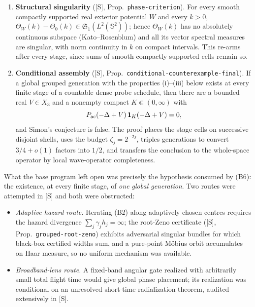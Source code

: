 \documentclass[11pt]{article}
\theoremstyle{remark}
\theoremstyle{definition}
\newcommand{\T}{\mathbb T}
\newcommand{\Sone}{\mathfrak S_1}
\newcommand{\ac}{{\rm ac}}
\begin{document}
\begin{enumerate}[label=\textup{(B\arabic*)},leftmargin=*]
       each targeted integral with its $\T^M$ mean \emph{and} locking of
       every listed protected quantity on all of $K$.
 \item \textbf{Structural singularity} ([S], Prop.\
       \texttt{phase-criterion}).  For every smooth compactly supported real
       exterior potential $W$ and every $k>0$,
       $\Theta_W(k)-\Theta_0(k)\in\Sone(L^2(\mathbb S^2))$; hence
       $\Theta_W(k)$ has no absolutely continuous subspace (Kato--Rosenblum)
       and all its vector spectral measures are singular, with norm
       continuity in $k$ on compact intervals.  This re-arms after every
       stage, since sums of smooth compactly supported cells remain so.
 \item \textbf{Conditional assembly} ([S], Prop.\
       \texttt{conditional-counterexample-final}).  If a global grouped
       generation with the properties (i)--(iii) below exists at every finite
       stage of a countable dense probe schedule, then there are a bounded
       real $V\in X_3$ and a nonempty compact $K\Subset(0,\infty)$ with
       \begin{equation}
        P_{\ac}(-\Delta+V)\,\mathbf 1_K(-\Delta+V)=0 ,
        \label{eq:final-counterexample}
       \end{equation}
       and Simon's conjecture is false.  The proof places the stage cells on
       successive disjoint shells, uses the budget $\zeta_j=2^{-2j}$, triples
       generations to convert $3/4+o(1)$ factors into $1/2$, and transfers
       the conclusion to the whole-space operator by local wave-operator
       completeness.
\end{enumerate}

What the base program left open was precisely the hypothesis consumed by
(B6): the existence, at every finite stage, of \emph{one global generation}.
Two routes were attempted in [S] and both were obstructed:

\begin{itemize}
 \item \emph{Adaptive hazard route.}  Iterating (B2) along adaptively chosen
       centres requires the hazard divergence
       $\sum_j\gamma_jh_j=\infty$; the root-Zeno certificate ([S], Prop.\
       \texttt{grouped-root-zeno}) exhibits adversarial singular bundles for
       which black-box certified widths sum, and a pure-point M\"obius orbit
       accumulates on Haar measure, so no uniform mechanism was available.
 \item \emph{Broadband-lens route.}  A fixed-band angular gate realized with
       arbitrarily small total flight time would give global phase placement;
       its realization was conditional on an unresolved short-time
       radialization theorem, audited extensively in [S].
\end{itemize}
\end{document}
